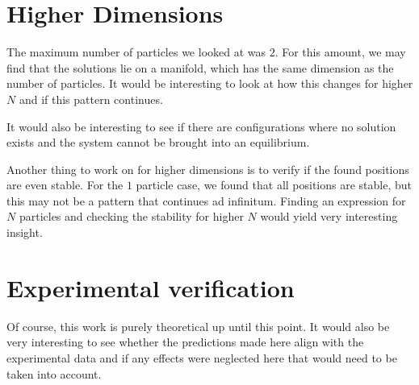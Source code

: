 \section{Higher Dimensions}

The maximum number of particles we looked at was $2$.
For this amount, we may find that the solutions lie on a manifold,
    which has the same dimension as the number of particles.
It would be interesting to look at how this changes for higher $N$
    and if this pattern continues.

It would also be interesting to see if there are configurations where no solution exists
    and the system cannot be brought into an equilibrium.

Another thing to work on for higher dimensions is to verify if the found positions are even stable.
For the $1$ particle case, we found that all positions are stable,
    but this may not be a pattern that continues ad infinitum.
Finding an expression for $N$ particles 
    and checking the stability for higher $N$ would yield very interesting insight.


%
%
%

\section{Experimental verification}

Of course, this work is purely theoretical up until this point.
It would also be very interesting to see whether the predictions made here align with the experimental data 
    and if any effects were neglected here that would need to be taken into account.

